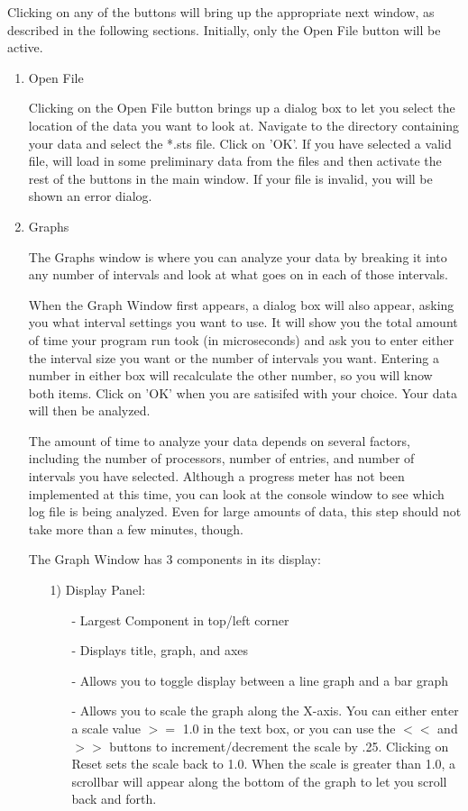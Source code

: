 Clicking on any of the buttons will bring up the appropriate next window, as
described in the following sections.  Initially, only the Open File button
will be active.
\begin{enumerate}
\item
Open File

   Clicking on the Open File button brings up a dialog box to let you select
   the location of the data you want to look at.  Navigate to the directory
   containing your data and select the *.sts file.  Click on 'OK'.  If you
   have selected a valid file, \projections{} will load in some preliminary data
   from the files and then activate the rest of the buttons in the main window.
   If your file is invalid, you will be shown an error dialog.

\item
Graphs

   The Graphs window is where you can analyze your data by breaking it into
   any number of intervals and look at what goes on in each of those intervals.

   When the Graph Window first appears, a dialog box will also appear, asking
   you what interval settings you want to use.  It will show you the total
   amount of time your program run took (in microseconds) and ask you to enter
   either the interval size you want or the number of intervals you want.
   Entering a number in either box will recalculate the other number, so you
   will know both items. Click on 'OK' when you are satisifed with your choice.
   Your data will then be analyzed.

   The amount of time to analyze your data depends on several factors, including
   the number of processors, number of entries, and number of intervals you have
   selected.  Although a progress meter has not been implemented at this time,
   you can look at the console window to see which log file is being analyzed.
   Even for large amounts of data, this step should not take more than a few
   minutes, though.

   The Graph Window has 3 components in its display:
   \begin{enumerate}
   \item[1)]
   Display Panel:
      \begin{itemize}
      \item[-]
        Largest Component in top/left corner
      \item[-]
        Displays title, graph, and axes
      \item[-]
        Allows you to toggle display between a line graph and a bar graph
      \item[-]
        Allows you to scale the graph along the X-axis.  You can either enter
        a scale value $>=$ 1.0 in the text box, or you can use the $<<$ and $>>$
        buttons to increment/decrement the scale by .25.  Clicking on Reset
        sets the scale back to 1.0.  When the scale is greater than 1.0, a
        scrollbar will appear along the bottom of the graph to let you
        scroll back and forth.
      \end{itemize}


\end{enumerate}
\end{enumerate}
